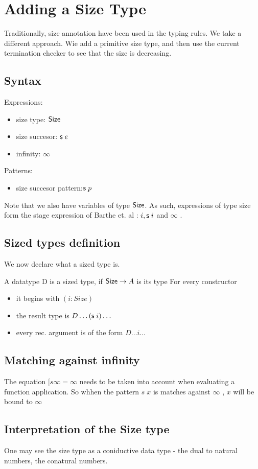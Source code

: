 \chapter{Adding a Size Type}
Traditionally, size annotation have been used in the typing rules.
We take a different approach.
Wie add a primitive size type, and then use the current termination checker to see that the size is 
decreasing.
\section{Syntax}

Expressions:
\begin{itemize}
\item
size type: $ \mathsf{Size} $ 
\item
size succesor: $\mathsf{s}\; e $ 
\item
infinity: $\infty$ 
\end{itemize}
Patterns:
\begin{itemize}
\item
size succesor pattern:$ \mathsf{s}\; p $ 
\end{itemize}
Note that we also have variables of type $\mathsf{Size}$.
As such, expressions of type size form the stage expression of Barthe et. al :  $ i , \mathsf{s}\; i $ and $ \infty $ .
\section{Sized types definition}
We now declare what a sized type is.
\begin{definition}
A datatype D is a sized type, if $ \mathsf{Size} \rightarrow A $ is its type
For every constructor 
\begin{itemize}
\item
it begins with $(i: Size)$
\item
the result type is $D \dots (\mathsf{s}\; i) \dots $
\item
every rec. argument is of the form $ D \dots i \dots $
\end{itemize}
\end{definition}
\section{Matching against infinity}
The equation 
$[ s \infty = \infty $
needs to be taken into account when evaluating a function application.
So whhen the pattern $ s \; x $ is matches against $ \infty $ , $x$ will be bound to $ \infty $  
\section{Interpretation of the Size type}
One may see the size type as a coniductive data type - the dual to natural numbers, the conatural numbers.
